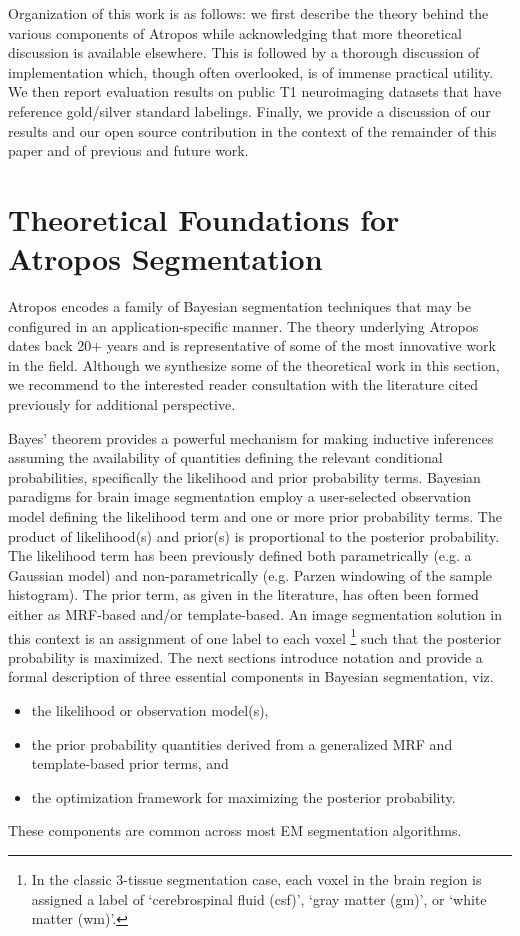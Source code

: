 \documentclass[11pt,english]{article}
\begin{document}
Organization of this work is as follows: we first describe the theory
behind the various components of Atropos while
acknowledging that more theoretical discussion is available elsewhere.  
This is followed by a thorough
discussion of implementation which, though often overlooked, is of
immense practical utility.  We then report evaluation results on
public T1 neuroimaging datasets that have reference gold/silver
standard labelings.  Finally, we provide a discussion of our results
and our open source contribution in the context of the remainder of
this paper and of previous and future work.

\section{Theoretical Foundations for Atropos Segmentation} 

Atropos encodes a family of Bayesian segmentation techniques that may
be configured in an application-specific manner.  The theory
underlying Atropos dates back 20$+$ years and is representative of
some of the most innovative work in the field.  Although we synthesize
some of the theoretical work in this section, we recommend to the
interested reader consultation with the literature cited previously
for additional perspective.

Bayes' theorem provides a powerful mechanism for making inductive
inferences assuming the availability of quantities defining the
relevant conditional probabilities, specifically the likelihood and
prior probability terms.  Bayesian paradigms for brain image
segmentation employ a user-selected observation model defining the
likelihood term and one or more prior probability terms.  The product
of likelihood(s) and prior(s) is proportional to the posterior
probability.  The likelihood term has been previously defined both 
parametrically (e.g. a Gaussian model) and non-parametrically
(e.g. Parzen windowing of the sample histogram).  The prior term, as
given in the literature, has often been formed either as
MRF-based and/or template-based.  An image segmentation solution in this
context is an assignment of one label to each voxel%
\footnote{
In the classic 3-tissue segmentation case, each voxel in the brain region is assigned a label of `cerebrospinal fluid (csf)', `gray matter (gm)', or `white matter (wm)'. 
}
such that the posterior probability is maximized.  The next sections
introduce notation and provide a formal description of three essential
components in Bayesian segmentation, viz.
\begin{itemize}
  \item the likelihood or observation model(s),
  \item the prior probability quantities derived from a generalized
    MRF and template-based prior terms, and 
  \item the optimization framework for maximizing the posterior probability.
\end{itemize}
These components are common across most EM segmentation algorithms. 
\end{document}

